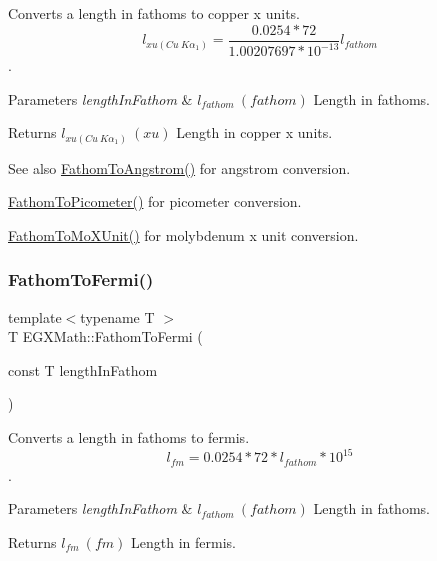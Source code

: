 Converts a length in fathoms to copper x units. \[ l_{xu(Cu\ K\alpha_1)}=\frac{0.0254 * 72}{1.00207697*10^{-13}} l_{fathom}\]. 


\begin{DoxyParams}{Parameters}
{\em length\+In\+Fathom} & $ l_{fathom}\ (fathom)$ Length in fathoms. \\
\hline
\end{DoxyParams}
\begin{DoxyReturn}{Returns}
$ l_{xu(Cu\ K\alpha_1)}\ (xu)$ Length in copper x units. 
\end{DoxyReturn}
\begin{DoxySeeAlso}{See also}
\mbox{\hyperlink{group___e_g_x_math-_conversions-_length_conversions-_nautical-_fathom-_non-_s_i_gac03859840078c2a19cbf1f79bcf2b919}{Fathom\+To\+Angstrom()}} for angstrom conversion. 

\mbox{\hyperlink{group___e_g_x_math-_conversions-_length_conversions-_nautical-_fathom-_s_i_gad5fe5d3a1a48420dc43cd2826a9b6f71}{Fathom\+To\+Picometer()}} for picometer conversion. 

\mbox{\hyperlink{group___e_g_x_math-_conversions-_length_conversions-_nautical-_fathom-_non-_s_i_ga1e69cf778d1b7f72cd015b6cc81fc71c}{Fathom\+To\+Mo\+X\+Unit()}} for molybdenum x unit conversion. 
\end{DoxySeeAlso}
\mbox{\label{group___e_g_x_math-_conversions-_length_conversions-_nautical-_fathom-_non-_s_i_ga4590b655273e874c79a47de291226548}} 
\subsubsection{\texorpdfstring{Fathom\+To\+Fermi()}{FathomToFermi()}}
{\footnotesize\ttfamily template$<$typename T $>$ \\
T E\+G\+X\+Math\+::\+Fathom\+To\+Fermi (\begin{DoxyParamCaption}\item[{const T}]{length\+In\+Fathom }\end{DoxyParamCaption})}



Converts a length in fathoms to fermis. \[ l_{fm}=0.0254 * 72 * l_{fathom} * 10^{15} \]. 


\begin{DoxyParams}{Parameters}
{\em length\+In\+Fathom} & $ l_{fathom}\ (fathom)$ Length in fathoms. \\
\hline
\end{DoxyParams}
\begin{DoxyReturn}{Returns}
$ l_{fm}\ (fm)$ Length in fermis. 
\end{DoxyReturn}
\mbox{\label{group___e_g_x_math-_conversions-_length_conversions-_nautical-_fathom-_non-_s_i_ga491b6bb1b4db49ba22471e9ca9855198}} 
